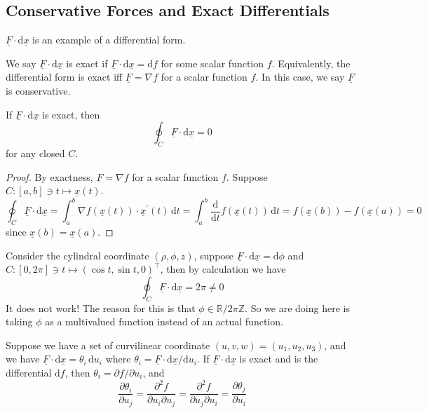 \subsection{Conservative Forces and Exact Differentials}
$\underline{F}\cdot\mathrm d\underline{x}$ is an example of a differential form.
\begin{definition}
    We say $\underline{F}\cdot\mathrm d\underline{x}$ is exact if $\underline{F}\cdot\mathrm d\underline{x}=\mathrm df$ for some scalar function $f$.
    Equivalently, the differential form is exact iff $\underline{F}=\nabla f$ for a scalar function $f$.
    In this case, we say $\underline{F}$ is conservative.
\end{definition}
\begin{proposition}
    If $\underline{F}\cdot\mathrm d\underline{x}$ is exact, then
    $$\oint_C\underline{F}\cdot\mathrm d\underline{x}=0$$
    for any closed $C$.
\end{proposition}
\begin{proof}
    By exactness, $\underline{F}=\nabla f$ for a scalar function $f$.
    Suppose $C: [a,b]\ni t\mapsto\underline{x}(t)$.
    $$\oint_C\underline{F}\cdot\mathrm d\underline{x}=\int_a^b\nabla f(\underline{x}(t))\cdot\underline{x}^\prime(t)\,\mathrm dt=\int_a^b\frac{\mathrm d}{\mathrm dt}f(\underline{x}(t))\,\mathrm dt=f(\underline{x}(b))-f(\underline{x}(a))=0$$
    since $\underline{x}(b)=\underline{x}(a)$.
\end{proof}
\begin{remark}
    Consider the cylindral coordinate $(\rho,\phi,z)$, suppose $\underline{F}\cdot\mathrm d\underline{x}=\mathrm d\phi$ and $C:[0,2\pi]\ni t\mapsto (\cos t,\sin t,0)^\top$, then by calculation we have
    $$\oint_C \underline{F}\cdot\mathrm d\underline{x}=2\pi\neq 0$$
    It does not work!
    The reason for this is that $\phi\in\mathbb R/2\pi\mathbb Z$.
    So we are doing here is taking $\phi$ as a multivalued function instead of an actual function.
\end{remark}
Suppose we have a set of curvilinear coordinate $(u,v,w)=(u_1,u_2,u_3)$, and we have $\underline{F}\cdot\mathrm d\underline{x}=\theta_i\,\mathrm du_i$ where $\theta_i=\underline{F}\cdot\mathrm d\underline{x}/\mathrm du_i$.
If $\underline{F}\cdot\mathrm d\underline{x}$ is exact and is the differential $\mathrm df$, then $\theta_i=\partial f/\partial u_i$, and
$$\frac{\partial \theta_i}{\partial u_j}=\frac{\partial^2 f}{\partial u_i\partial u_j}=\frac{\partial^2 f}{\partial u_j\partial u_i}=\frac{\partial \theta_j}{\partial u_i}$$
